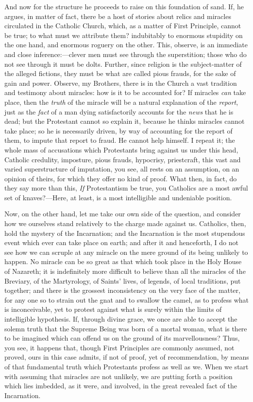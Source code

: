 And now for the structure he proceeds to raise on this
foundation of sand. If, he argues, in matter of fact,
there be a host of stories about relics and miracles
circulated in the Catholic Church, which, as a matter of
First Principle, cannot be true; to what must we
attribute them? indubitably to enormous stupidity on the
one hand, and enormous roguery on the other. This,
observe, is an immediate and close inference:—clever
men must see through the superstition; those who do not
see through it must be dolts. Further, since religion is
the subject-matter of the alleged fictions, they must be
what are called pious frauds, for the sake of gain and
power. Observe, my Brothers, there is in the Church a
vast tradition and testimony about miracles: how is it to
be accounted for? If miracles \emph{can} take place,
then the \emph{truth} of the miracle will be a natural
explanation of the \emph{report}, just as the \emph{fact}
of a man dying satisfactorily accounts for the \emph{news}
that he is dead; but the Protestant cannot so explain it,
because he thinks miracles cannot take place; so he is
necessarily driven, by way of accounting for the report
of them, to impute that report to fraud. He cannot help
himself. I repeat it; the whole mass of accusations which
Protestants bring against us under this head, Catholic
credulity, imposture, pious frauds, hypocrisy,
priestcraft, this vast and varied superstructure of
imputation, you see, all rests on an assumption, on an
opinion of theirs, for which they offer no kind of proof.
What then, in fact, do they say more than this, \emph{If}
Protestantism be true, you Catholics are a most awful set
of knaves?—Here, at least, is a most intelligible
and undeniable position.

Now, on the other hand, let me take our own side of
the question, and consider how we ourselves stand
relatively to the charge made against us. Catholics,
then, hold the mystery of the Incarnation; and the
Incarnation is the most stupendous event which ever can
take place on earth; and after it and henceforth, I do
not see how we can scruple at any miracle on the mere
ground of its being unlikely to happen. No miracle can be
so great as that which took place in the Holy House of
Nazareth; it is indefinitely more difficult to believe
than all the miracles of the Breviary, of the
Martyrology, of Saints' lives, of legends, of local
traditions, put together; and there is the grossest
inconsistency on the very face of the matter, for any one
so to strain out the gnat and to swallow the camel, as to
profess what is inconceivable, yet to protest against
what is surely within the limits of intelligible
hypothesis. If, through divine grace, we once are able to
accept the solemn truth that the Supreme Being was born
of a mortal woman, what is there to be imagined which can
offend us on the ground of its marvellousness? Thus, you
see, it happens that, though First Principles are
commonly assumed, not proved, ours in this case admits,
if not of proof, yet of recommendation, by means of that
fundamental truth which Protestants profess as well as
we. When we start with assuming that miracles are not
unlikely, we are putting forth a position which lies
imbedded, as it were, and involved, in the great revealed
fact of the Incarnation.


